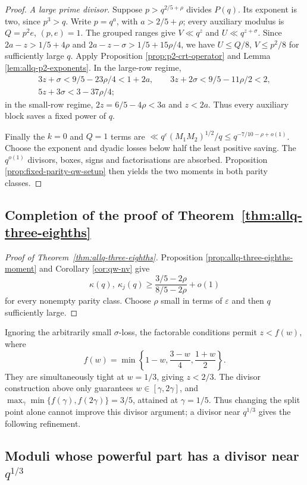 \documentclass[12pt, a4paper]{amsart}
\numberwithin{equation}{section}
\newcommand{\ep}{\varepsilon}
\renewcommand{\le}{\leqslant}
\renewcommand{\ge}{\geqslant}
\theoremstyle{plain}
\begin{document}
\begin{proof}
\emph{A large prime divisor.} Suppose $p>q^{2/5+\rho}$ divides $P(q)$. Its exponent is two, since $p^3>q$. Write $p=q^{a}$, with $a>2/5+\rho$; every auxiliary modulus is $Q=p^2e$, $(p,e)=1$. The grouped ranges give $V\ll q^{z}$ and $U\ll q^{z+\sigma}$. Since $2a-z>1/5+4\rho$ and $2a-z-\sigma>1/5+15\rho/4$, we have $U\le Q/8$, $V\le p^2/8$ for sufficiently large $q$. Apply Proposition \ref{prop:p2-crt-operator} and Lemma \ref{lem:allq-p2-exponents}. In the large-row regime,
\begin{gather*}
3z+\sigma<9/5-23\rho/4<1+2a,
\qquad
3z+2\sigma<9/5-11\rho/2<2,\\
5z+3\sigma<3-37\rho/4;
\end{gather*}
in the small-row regime, $2z=6/5-4\rho<3a$ and $z<2a$. Thus every auxiliary block saves a fixed power of $q$.

Finally the $k=0$ and $Q=1$ terms are $\ll q^\ep(M_1M_2)^{1/2}/q\le q^{-7/10-\rho+o(1)}$. Choose the exponent and dyadic losses below half the least positive saving. The $q^{o(1)}$ divisors, boxes, signs and factorisations are absorbed. Proposition \ref{prop:fixed-parity-qw-setup} then yields the two moments in both parity classes.
\end{proof}

\subsection{Completion of the proof of Theorem~\ref{thm:allq-three-eighths}}
\label{sec:proof-allq-main}

\begin{proof}[Proof of Theorem~\ref{thm:allq-three-eighths}]
Proposition \ref{prop:allq-three-eighths-moment} and Corollary \ref{cor:qw-nv} give
$$
\kappa(q),\ \kappa_j(q)\ge\frac{3/5-2\rho}{8/5-2\rho}+o(1)
$$
for every nonempty parity class. Choose $\rho$ small in terms of $\ep$ and then $q$ sufficiently large.
\end{proof}

Ignoring the arbitrarily small $\sigma$-loss, the factorable conditions permit $z<f(w)$, where
$$
f(w)=\min\left\{1-w,\frac{3-w}{4},\frac{1+w}{2}\right\}.
$$
They are simultaneously tight at $w=1/3$, giving $z<2/3$. The divisor construction above only guarantees $w\in[\gamma,2\gamma]$, and $\max_{\gamma}\min\{f(\gamma),f(2\gamma)\}=3/5$, attained at $\gamma=1/5$. Thus changing the split point alone cannot improve this divisor argument; a divisor near $q^{1/3}$ gives the following refinement.

\subsection{Moduli whose powerful part has a divisor near $q^{1/3}$}\label{sec:third-divisor}
\end{document}
